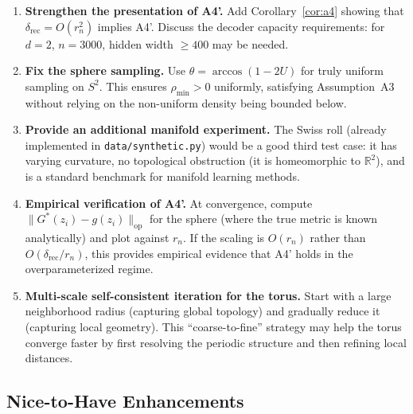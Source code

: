 \documentclass{article}
\DeclareMathOperator{\op}{op}
\newcommand{\RR}{\mathbb{R}}
\begin{document}
\begin{enumerate}[label=\textbf{I\arabic*.}]
    \item \textbf{Strengthen the presentation of A4'.}
      Add Corollary~\ref{cor:a4} showing that $\delta_{\mathrm{rec}} =
      O(r_n^2)$ implies A4'. Discuss the decoder capacity requirements:
      for $d=2$, $n=3000$, hidden width $\geq 400$ may be needed.

    \item \textbf{Fix the sphere sampling.}
      Use $\theta = \arccos(1 - 2U)$ for truly uniform sampling on $S^2$.
      This ensures $\rho_{\min} > 0$ uniformly, satisfying Assumption~A3
      without relying on the non-uniform density being bounded below.

    \item \textbf{Provide an additional manifold experiment.}
      The Swiss roll (already implemented in \texttt{data/synthetic.py}) would
      be a good third test case: it has varying curvature, no topological
      obstruction (it is homeomorphic to $\RR^2$), and is a standard benchmark
      for manifold learning methods.

    \item \textbf{Empirical verification of A4'.}
      At convergence, compute $\|G^*(z_i) - g(z_i)\|_{\op}$ for the sphere
      (where the true metric is known analytically) and plot against $r_n$.
      If the scaling is $O(r_n)$ rather than $O(\delta_{\mathrm{rec}}/r_n)$,
      this provides empirical evidence that A4' holds in the overparameterized
      regime.

    \item \textbf{Multi-scale self-consistent iteration for the torus.}
      Start with a large neighborhood radius (capturing global topology) and
      gradually reduce it (capturing local geometry). This ``coarse-to-fine''
      strategy may help the torus converge faster by first resolving the
      periodic structure and then refining local distances.
\end{enumerate}

\subsection{Nice-to-Have Enhancements}
\end{document}
